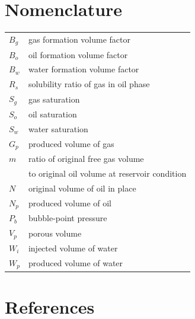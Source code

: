 \documentclass[authoryear,preprint,review,11pt]{elsarticle}
\begin{document}
\section*{Nomenclature}
\begin{tabular}{ll}
$B_g$ & gas formation volume factor\\
$B_o$ & oil formation volume factor\\
$B_w$ & water formation volume factor\\
$R_s$ & solubility ratio of gas in oil phase\\
$S_g$ & gas saturation \\
$S_o$ & oil saturation \\
$S_w$ & water saturation \\
$G_p$ & produced volume of gas \\
$m$ & ratio of original free gas volume \\
& to original oil volume at reservoir condition \\
$N$ & original volume of oil in place \\
$N_p$ & produced volume of oil \\
$P_b$ & bubble-point pressure \\
$V_p$ & porous volume \\
$W_i$ & injected volume of water \\
$W_p$ & produced volume of water
\end{tabular}
\section*{References}


\cite{*}

\end{document}
